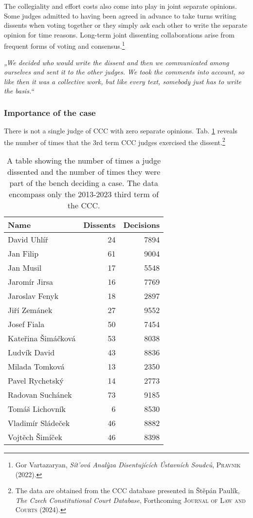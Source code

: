 \documentclass[
  11pt,
]{article}
\begin{document}
The collegiality and effort costs also come into play in joint separate opinions. Some judges admitted to having been agreed in advance to take turns writing dissents when voting together or they simply ask each other to write the separate opinion for time reasons. Long-term joint dissenting collaborations arise from frequent forms of voting and consensus.\footnote{Gor Vartazaryan, \emph{Sít'ová Analỳza Disentujících Ústavních Soudců}, \textsc{Pravnik} (2022).}

\emph{„We decided who would write the dissent and then we communicated among ourselves and sent it to the other judges. We took the comments into account, so like then it was a collective work, but like every text, somebody just has to write the basis.``}

\subsubsection{Importance of the case}\label{importance-of-the-case}

There is not a single judge of CCC with zero separate opinions. Tab. \ref{tab:dissent-rate} reveals the number of times that the 3rd term CCC judges exercised the dissent.\footnote{The data are obtained from the CCC database presented in Štěpán Paulík, \emph{The {Czech Constitutional Court Database}}, Forthcoming \textsc{Journal of Law and Courts} (2024).}

\begin{table}

\caption{\label{tab:dissent-rate}A table showing the number of times a judge dissented and the number of times they were part of the bench deciding a case. The data encompass only the 2013-2023 third term of the CCC.}
\centering
\begin{tabular}[t]{l|r|r}
\hline
Name & Dissents & Decisions\\
\hline
David Uhlíř & 24 & 7894\\
\hline
Jan Filip & 61 & 9004\\
\hline
Jan Musil & 17 & 5548\\
\hline
Jaromír Jirsa & 16 & 7769\\
\hline
Jaroslav Fenyk & 18 & 2897\\
\hline
Jiří Zemánek & 27 & 9552\\
\hline
Josef Fiala & 50 & 7454\\
\hline
Kateřina Šimáčková & 53 & 8038\\
\hline
Ludvík David & 43 & 8836\\
\hline
Milada Tomková & 13 & 2350\\
\hline
Pavel Rychetský & 14 & 2773\\
\hline
Radovan Suchánek & 73 & 9185\\
\hline
Tomáš Lichovník & 6 & 8530\\
\hline
Vladimír Sládeček & 46 & 8882\\
\hline
Vojtěch Šimíček & 46 & 8398\\
\hline
\end{tabular}
\end{table}
\end{document}
